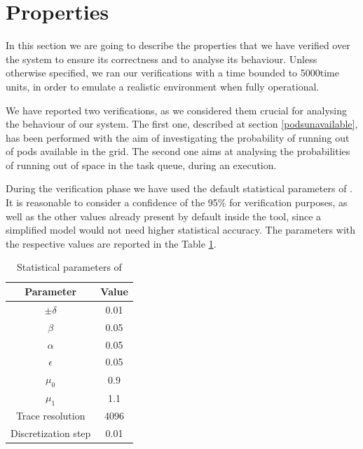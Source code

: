 \newcommand{\tauconst}{5000}
\newcommand{\query}{[INSERIRE LA QUERY CON NOTAZIONE CTL]}
\newcommand{\mT}{\ensuremath{\mu_T}}
\newcommand{\vT}{\ensuremath{\sigma_T}}
\newcommand{\mH}{\ensuremath{\mu_H}}
\newcommand{\vH}{\ensuremath{\sigma_H}}
\newcommand{\K}{\ensuremath{K}}
\newcommand{\expdel}{\ensuremath{\lambda}}

\section{Properties}
In this section we are going to describe the properties that we have verified over the system to ensure its correctness and to analyse its behaviour. Unless otherwise specified, we ran our verifications with a time bounded to \tauconst \space time units, in order to emulate a realistic environment when fully operational.

We have reported two verifications, as we considered them crucial for analysing the behaviour of our system. The first one, described at section \ref{podsunavailable}, has been performed with the aim of investigating the probability of running out of pods available in the grid. The second one aims at analysing the probabilities of running out of space in the task queue, during an execution.

During the verification phase we have used the default statistical parameters of \UPPAAL. It is reasonable to consider a confidence of the 95\% for verification purposes, as well as the other values already present by default inside the tool, since a simplified model would not need higher statistical accuracy. The parameters with the respective values are reported in the Table \ref{tab:statparam}.

\begin{table}[h]
    \centering
        \begin{tabular}{|c c|} 
            \hline
            Parameter & Value \\ [0.5ex] 
            \hline\hline
            $\pm\delta$ & 0.01 \\
            $\beta$ & 0.05 \\
            $\alpha$ & 0.05 \\
            $\epsilon$ & 0.05 \\
            $\mu_0$ & 0.9 \\
            $\mu_1$ & 1.1 \\
            Trace resolution & 4096 \\
            Discretization step & 0.01 \\ [0.5ex] 
            \hline
        \end{tabular}
        \caption{Statistical parameters of \UPPAAL}
        \label{tab:statparam}
\end{table}

